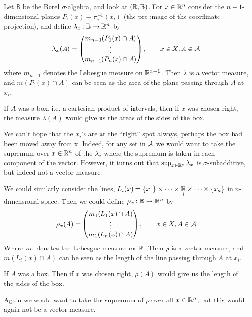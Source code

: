 \documentclass[../../main.tex]{subfiles}
\begin{document}
\begin{example}\label{ex: selfmade examples}
Let $\mathbb{B}$ be the Borel $\sigma$-algebra, and look at $(\mathbb{R}, \mathbb{B})$. For $x\in \mathbb{R}^{n}$ consider the $n-1$-dimensional planes $P_{i}(x)=\pi_{i}^{-1}(x_{i})$ (the pre-image of the coordinate projection), and define $\lambda_{x}:\mathbb{B}\to \mathbb{R}^{n}$ by
\begin{align*}
	\lambda_{x}(A)=\begin{pmatrix}
		m_{n-1}(P_{1}(x)\cap A) \\
		\vdots \\
		m_{n-1}(P_{n}(x)\cap A)
	\end{pmatrix}, \qquad x\in X, A\in \mathcal{A}
\end{align*}
where $m_{n-1}$ denotes the Lebesgue measure on $\mathbb{R}^{n-1}$. Then $\lambda$ is a vector measure, and $m(P_{i}(x)\cap A)$ can be seen as the area of the plane passing through $A$ at $x_{i}$.

If $A$ was a box, i.e. a cartesian product of intervals, then if $x$ was chosen right, the measure $\lambda(A)$ would give us the areas of the sides of the box.

We can't hope that the $x_{i}$'s are at the ``right'' spot always, perhaps the box had been moved away from x. Indeed, for any set in $\mathcal{A}$ we would want to take the supremum over $x\in \mathbb{R}^{n}$ of the $\lambda_{x}$ where the supremum is taken in each component of the vector. However, it turns out that $\sup_{x\in \mathbb{R}^{n}}\lambda_{x}$ is $\sigma$-subadditive, but indeed not a vector measure.

We could similarly consider the lines, $L_{i}(x)=\{x_{1}\}\times \dots \times \underset{i}{\mathbb{R}}\times \dots \times \{x_{n}\}$ in $n$-dimensional space. Then we could define $\rho_{x}:\mathbb{B}\to \mathbb{R}^{n}$ by
\begin{align*}
	\rho_{x}(A)=\begin{pmatrix}
		m_{1}(L_{1}(x)\cap A) \\
		\vdots \\
		m_{1}(L_{n}(x)\cap A)
	\end{pmatrix}, \qquad x\in X, A\in \mathcal{A}
\end{align*}
Where $m_{1}$ denotes the Lebesgue measure on $\mathbb{R}$. Then $\rho$ is a vector measure, and $m(L_{i}(x)\cap A)$ can be seen as the length of the line passing through $A$ at $x_{i}$.

If $A$ was a box. Then if $x$ was chosen right, $\rho(A)$ would give us the length of the sides of the box.

Again we would want to take the supremum of $\rho$ over all $x\in \mathbb{R}^{n}$, but this would again not be a vector measure.
\end{example}
\end{document}
